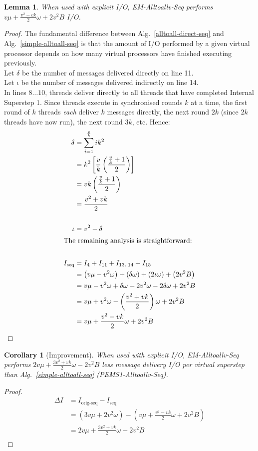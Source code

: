 \documentclass[12pt]{carletoncsthesis}
\newtheorem{lemma}[thm]{Lemma}
\newtheorem{corollary}[thm]{Corollary}
\begin{document}
\begin{lemma}
\label{alltoall-direct-seq-io}
When used with explicit I/O, {\sc EM-Alltoallv-Seq} performs
$v\mu + \frac{v^2 - vk}{2}\omega + 2v^2B$ I/O.
\end{lemma}
\begin{proof}
The fundamental difference between Alg.~\ref{alltoall-direct-seq} and
Alg.~\ref{simple-alltoall-seq} is that the amount of I/O performed by a
given virtual processor depends on how many virtual processors have finished
executing previously.\\
Let $\delta$ be the number of messages delivered directly on line 11.\\
Let $\iota$ be the number of messages delivered indirectly on line 14.\\
In lines $8{\ldots}10$, threads deliver directly to all threads that have
completed Internal Superstep 1.  Since threads execute in synchronised
rounds $k$ at a time, the first round of $k$ threads {\em each} deliver $k$
messages directly, the next round $2k$ (since $2k$ threads have now run),
the next round $3k$, etc.  Hence:
\begin{align*}
\delta	&= \displaystyle\sum_{i=1}^{\frac{v}{k}} ik^2 \\
		&= k^2 \left[\frac{v}{k}\left(\frac{\frac{v}{k}+1}{2}\right)\right] \\
		&= vk\left(\frac{\frac{v}{k}+1}{2}\right) \\
		&= \frac{v^2 + vk}{2} \\
\\
\iota	&= v^2 - \delta \\
\intertext{The remaining analysis is straightforward:}\\
I_{\text{seq}} &= I_{4} + I_{11} + I_{13..14} + I_{15} \\
&=	  \left( v\mu - v^2\omega \right)
	+ \left( \delta \omega \right)
	+ \left( 2\iota\omega \right)
	+ \left( 2v^2B \right) \\
&=	v\mu - v^2\omega + \delta\omega + 2v^2\omega - 2\delta\omega + 2v^2B \\
&=	v\mu + v^2\omega - \left(\frac{v^2 + vk}{2}\right)\omega + 2v^2B \\
&=	v\mu + \frac{v^2 - vk}{2}\omega + 2v^2B
\end{align*}
\end{proof}

\begin{corollary}[Improvement]
\label{alltoall-direct-seq-imp}
When used with explicit I/O, {\sc EM-Alltoallv-Seq} performs $2v\mu +
\frac{3v^2 + vk}{2}\omega - 2v^2B$ less message delivery I/O per virtual
superstep than Alg.~\ref{simple-alltoall-seq} ({\sc PEMS1-Alltoallv-Seq}).
\end{corollary}
\begin{proof}
\[
\begin{aligned}
\Delta{I}
	&= I_{\text{orig-seq}} - I_{\text{seq}} \\
	&= \left(3v\mu + 2v^2\omega\right)
	   - \left(v\mu + \frac{v^2 - vk}{2}\omega + 2v^2B\right) \\
	&= 2v\mu + \frac{3v^2 + vk}{2}\omega - 2v^2B \\
\end{aligned}
\]
\end{proof}
\end{document}
